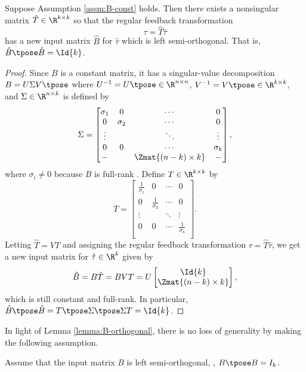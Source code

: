 \begin{lemma}\label{lemma:B-orthogonal}
    Suppose Assumption \ref{assm:B-const} holds. Then
    there exists a nonsingular matrix \(\hat{T} \in \R^{k \times k}\) 
    so that the regular feedback transformation 
    \[
        \tau = \hat{T} \hat{\tau}
    \] 
    has a new input matrix \(\hat{B}\) for \(\hat{\tau}\) which is left
    semi-orthogonal.  
    That is, \(\hat{B}\tpose \hat{B} = \Id{k}\).
\end{lemma}
\begin{proof}
Since \(B\) is a constant matrix, 
it has a singular-value decomposition 
\(B = U \Sigma V\tpose\) where \(U^{-1} = U\tpose \in \R^{n \times n}\), 
\(V^{-1} = V\tpose \in \R^{k \times k}\), and \(\Sigma \in \R^{n \times k}\) is
defined by
\[
    \Sigma = \begin{bmatrix}
        \sigma_1 & 0 & \cdots & 0 \\
        0 & \sigma_2 & \cdots & 0 \\
        \vdots & & \ddots & \vdots \\
        0 & 0 & \cdots & \sigma_k \\
        - &   & \Zmat{(n-k)\times k} & -  \\
    \end{bmatrix}
    ,
\]
where \(\sigma_i \neq 0\) because \(B\) is full-rank \cite{calculating_svd}.
Define \(T \in \R^{k \times k}\) by
\[
    T = \begin{bmatrix}
        \frac{1}{\sigma_1} & 0 & \cdots & 0 \\
        0 & \frac{1}{\sigma_2} & \cdots & 0 \\
    \vdots & & \ddots & \vdots \\
    0 & 0 & \cdots & \frac{1}{\sigma_k} \\
    \end{bmatrix}
    .
\]
Letting \(\hat{T} = V T\) and assigning the regular feedback
transformation \(\tau = \hat{T} \hat{\tau}\), 
we get a new input matrix for \(\hat{\tau} \in \R^k\) given by 
\[
    \hat{B} = B \hat{T} = B V T = 
    U \begin{bmatrix}
        \Id{k} \\ \Zmat{(n-k)\times k}
    \end{bmatrix}
    ,
\]
which is still constant and full-rank. 
In particular, 
\(\hat{B}\tpose \hat{B} = T\tpose \Sigma\tpose \Sigma T = \Id{k}\).
\end{proof}

In light of Lemma \ref{lemma:B-orthogonal}, there is no loss of generality
by making the following assumption.
\begin{assm}\label{assm:B-orthogonal}
    Assume that the input matrix \(B\) is
    left semi-orthogonal, \ie, \(B\tpose B = I_k\). 
\end{assm}

